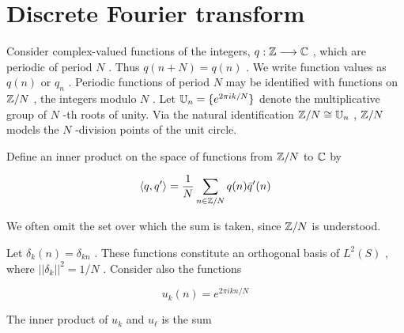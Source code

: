 
\setcounter{section}{16}


\begin{mathmacro}
\newcommand{\ZZ}[0]{\mathbb{Z}}
\newcommand{\CC}[0]{\mathbb{C}}
\newcommand{\UU}[0]{\mathbb{U}}
\newcommand{\FFF}[0]{\mathcal{F}}
\newcommand{\WW}[0]{\mathbb{W}}
\newcommand{\bra}[0]{\langle}
\newcommand{\ket}[0]{\rangle}
\newcommand{\set}[1]{\{#1\}}
\end{mathmacro}


 \section{Discrete  Fourier  transform}

 \innertableofcontents

Consider  complex-valued  functions  of  the  integers,
$q: \ZZ  \longrightarrow \CC $ ,  which  are  periodic  of  period   $N$ .   Thus   $q(n + N) = q(n)$ .   We  write  function  values  as   $q(n)$  or   $q_n$ .  Periodic  functions  of  period   $N$  may  be   identified  with  functions  on   $\ZZ/N$ ,  the  integers  modulo   $N$ .  Let
  $\UU_n = \set{ e^{2\pi i k/N}}$  denote  the  multiplicative  group  of   $N$  -th  roots  of  unity.
 Via  the  natural  identification   $\ZZ/N \cong \UU_n $ ,    $\ZZ/N$  models  the   $N$  -division  points   of  the  unit  circle.



Define  an  inner  product  on  the  space  of  functions  from   $\ZZ/N$  to   $\CC$  by



\begin{equation}
\label{fft_ip}
\langle q, q' \rangle
  =
\frac{1}{N}\sum_{n \in \ZZ/N} q(n)\bar q'(n)
\end{equation}


We  often  omit  the  set  over  which  the  sum  is  taken,  since   $\ZZ/N$  is  understood.



Let   $\delta_k(n) = \delta_{kn}$ .   These  functions  constitute  an  orthogonal  basis  of   $L^2(S)$ ,  where   $||\delta_k||^2 = 1/N$ .   Consider  also  the  functions



\begin{equation}
u_k(n) = e^{2\pi i kn/N}
\end{equation}


The  inner  product  of   $u_k$  and   $u_\ell$  is  the  sum



